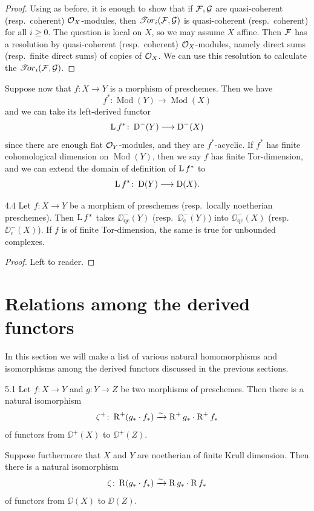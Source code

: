 \begin{proof}
Using  as before, it is enough to show that if $\mathcal{F},\mathcal{G}$ are quasi-coherent (resp.\ coherent) $\mathcal{O}_X$-modules, then $\mathop{\mathscr{T}\!or}\nolimits_i(\mathcal{F},\mathcal{G})$ is quasi-coherent (resp.\ coherent) for all $i\ge 0$. The question is local on $X$, so we may assume $X$ affine. Then $\mathcal{F}$ has a resolution by quasi-coherent (resp.\ coherent) $\mathcal{O}_X$-modules, namely direct sums (resp.\ finite direct sums) of copies of $\mathcal{O}_X$. We can use this resolution to calculate the $\mathop{\mathscr{T}\!or}\nolimits_i(\mathcal{F},\mathcal{G})$.
\end{proof}

Suppose now that $f\colon X\to Y$ is a morphism of preschemes. Then we have
\[
f^*\colon \operatorname{Mod}(Y) \longrightarrow \operatorname{Mod}(X)
\]
and we can take its left-derived functor
\[
\operatorname{L} f^*\colon \operatorname{D}^-(Y) \longrightarrow \operatorname{D}^-(X)
\]
since there are enough flat $\mathcal{O}_Y$-modules, and they are $f^*$-acyclic. If $f^*$ has finite cohomological dimension on $\operatorname{Mod}(Y)$, then we say $f$ has finite Tor-dimension, and we can extend the domain of definition of $\operatorname{L} f^*$ to
\[
\operatorname{L} f^*\colon \operatorname{D}(Y) \longrightarrow \operatorname{D}(X).
\]

\begin{bookproposition}{4.4}\label{prop:2.4.5}
Let $f\colon X\to Y$ be a morphism of preschemes (resp.\ locally noetherian preschemes). Then $\operatorname{L} f^*$ takes $\DD_{\mathrm{qc}}^-(Y)$ (resp.\ $\DD_{\mathrm{c}}^-(Y)$) into $\DD_{\mathrm{qc}}^-(X)$ (resp.\ $\DD_{\mathrm{c}}^-(X)$). If $f$ is of finite Tor-dimension, the same is true for unbounded complexes.
\end{bookproposition}

\begin{proof}
Left to reader.
\end{proof}
\section{Relations among the derived functors}\label{sec:2.5}

In this section we will make a list of various natural homomorphisms and isomorphisms among the derived functors discussed in the previous sections.

\begin{bookproposition}{5.1}\label{prop:2.5.1}
Let $f\colon X\to Y$ and $g\colon Y\to Z$ be two morphisms of preschemes. Then there is a natural isomorphism
\[
\zeta^+\colon \operatorname{R}^+(g_*\cdot f_*) \xrightarrow{\sim} \operatorname{R}^+g_*\cdot \operatorname{R}^+f_*
\]
of functors from $\DD^+(X)$ to $\DD^+(Z)$.

Suppose furthermore that $X$ and $Y$ are noetherian of finite Krull dimension. Then there is a natural isomorphism
\[
\zeta\colon \operatorname{R}(g_*\cdot f_*) \xrightarrow{\sim} \operatorname{R} g_*\cdot \operatorname{R} f_*
\]
of functors from $\DD(X)$ to $\DD(Z)$.
\end{bookproposition}

